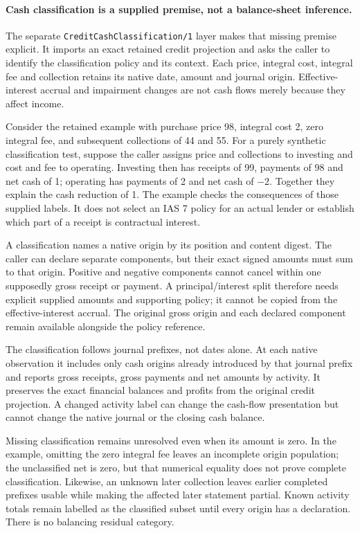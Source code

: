 \paragraph{Cash classification is a supplied premise, not a balance-sheet inference.}
\label{sec:credit-cash-classification}
The separate \texttt{CreditCashClassification/1} layer makes that missing
premise explicit. It imports an exact retained credit projection and asks the
caller to identify the classification policy and its context. Each price,
integral cost, integral fee and collection retains its native date, amount and
journal origin. Effective-interest accrual and impairment changes are not
cash flows merely because they affect income.

Consider the retained example with purchase price 98, integral cost 2, zero
integral fee, and subsequent collections of 44 and 55. For a purely synthetic
classification test, suppose the caller assigns price and collections to
investing and cost and fee to operating. Investing then has receipts of 99,
payments of 98 and net cash of 1; operating has payments of 2 and net cash of
$-2$. Together they explain the cash reduction of 1. The example checks the
consequences of those supplied labels. It does not select an IAS 7 policy for
an actual lender or establish which part of a receipt is contractual interest.

A classification names a native origin by its position and content digest.
The caller can declare separate components, but their exact signed amounts
must sum to that origin. Positive and negative components cannot cancel within
one supposedly gross receipt or payment. A principal/interest split therefore
needs explicit supplied amounts and supporting policy; it cannot be copied
from the effective-interest accrual. The original gross origin and each declared
component remain available alongside the policy reference.

The classification follows journal prefixes, not dates alone. At each native
observation it includes only cash origins already introduced by that journal
prefix and reports gross receipts, gross payments and net amounts by activity.
It preserves the exact financial balances and profits from the original credit
projection. A changed activity label can change the cash-flow presentation but
cannot change the native journal or the closing cash balance.

Missing classification remains unresolved even when its amount is zero. In the
example, omitting the zero integral fee leaves an incomplete origin population;
the unclassified net is zero, but that numerical equality does not prove complete
classification. Likewise, an unknown later collection leaves earlier completed
prefixes usable while making the affected later statement partial. Known
activity totals remain labelled as the classified subset until every origin
has a declaration. There is no balancing residual category.

